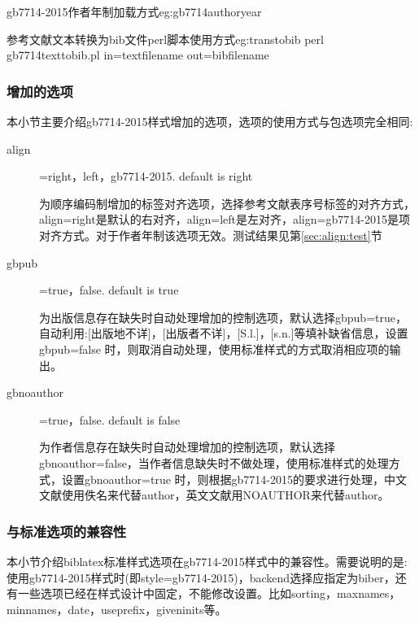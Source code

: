 \begin{codetex}{gb7714-2015作者年制加载方式}{eg:gb7714authoryear}
\usepackage[backend=biber,style=gb7714-2015ay]{biblatex}
\usepackage[backend=biber,style=gb7714-2015ay,gbpub=true,gbnoauthor=true]{biblatex}
\end{codetex}

\begin{codetex}{参考文献文本转换为bib文件perl脚本使用方式}{eg:transtobib}
perl gb7714texttobib.pl in=textfilename out=bibfilename
\end{codetex}

\subsubsection{增加的选项}
本小节主要介绍gb7714-2015样式增加的选项，选项的使用方式与包选项完全相同:
\begin{description}
  \item[align]=right，left，gb7714-2015. \hfill default is right

  为顺序编码制增加的标签对齐选项，选择参考文献表序号标签的对齐方式，align=right是默认的右对齐，align=left是左对齐，align=gb7714-2015是项对齐方式。对于作者年制该选项无效。测试结果见第\ref{sec:align:test}节

  \item[gbpub]=true，false. \hfill default is true

  为出版信息存在缺失时自动处理增加的控制选项，默认选择gbpub=true，自动利用:[出版地不详]，[出版者不详]，[S.l.]，[s.n.]等填补缺省信息，设置gbpub=false 时，则取消自动处理，使用标准样式的方式取消相应项的输出。

  \item[gbnoauthor]=true，false. \hfill default is false

  为作者信息存在缺失时自动处理增加的控制选项，默认选择gbnoauthor=false，当作者信息缺失时不做处理，使用标准样式的处理方式，设置gbnoauthor=true 时，则根据gb7714-2015的要求进行处理，中文文献使用佚名来代替author，英文文献用NOAUTHOR来代替author。
\end{description}


\subsubsection{与标准选项的兼容性}
本小节介绍biblatex标准样式选项在gb7714-2015样式中的兼容性。需要说明的是:使用gb7714-2015样式时(即style=gb7714-2015)，backend选择应指定为biber，还有一些选项已经在样式设计中固定，不能修改设置。比如sorting，maxnames，minnames，date，useprefix，giveninits等。

